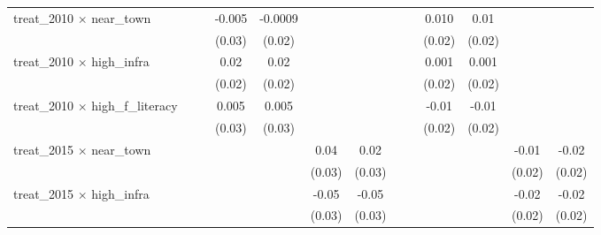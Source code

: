 \begin{adjustbox}{max width=\linewidth}
\begin{threeparttable}[b]
\begin{tabular}{lcccccccccccc}
         treat\_2010 $\times$ near\_town            &               &               & -0.005        & -0.0009       &               &               &               &               & 0.010         & 0.01          &               &   \\   
                                                    &               &               & (0.03)        & (0.02)        &               &               &               &               & (0.02)        & (0.02)        &               &   \\   
         treat\_2010 $\times$ high\_infra           &               &               & 0.02          & 0.02          &               &               &               &               & 0.001         & 0.001         &               &   \\   
                                                    &               &               & (0.02)        & (0.02)        &               &               &               &               & (0.02)        & (0.02)        &               &   \\   
         treat\_2010 $\times$ high\_f\_literacy     &               &               & 0.005         & 0.005         &               &               &               &               & -0.01         & -0.01         &               &   \\   
                                                    &               &               & (0.03)        & (0.03)        &               &               &               &               & (0.02)        & (0.02)        &               &   \\   
         treat\_2015 $\times$ near\_town            &               &               &               &               & 0.04          & 0.02          &               &               &               &               & -0.01         & -0.02\\   
                                                    &               &               &               &               & (0.03)        & (0.03)        &               &               &               &               & (0.02)        & (0.02)\\   
         treat\_2015 $\times$ high\_infra           &               &               &               &               & -0.05         & -0.05         &               &               &               &               & -0.02         & -0.02\\   
                                                    &               &               &               &               & (0.03)        & (0.03)        &               &               &               &               & (0.02)        & (0.02)\\   

\end{tabular}
\end{threeparttable}
\end{adjustbox}
